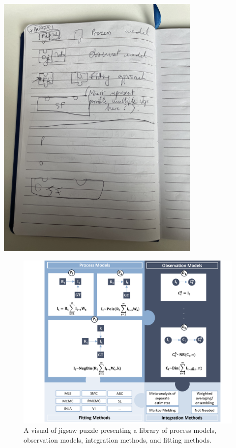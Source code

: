 \documentclass{article}
\begin{document}
\includegraphics[width=0.75\textwidth]{figures/cs0_diagram2.jpg}

\begin{figure}[htbp]
    \centering
    \includegraphics[width=\textwidth]{figures/Case study puzzle.png}
    \caption{A visual of jigsaw puzzle presenting a library of process models, observation models, integration methods, and fitting methods.}
    \label{fig:case_study_visual}
\end{figure}
\end{document}
